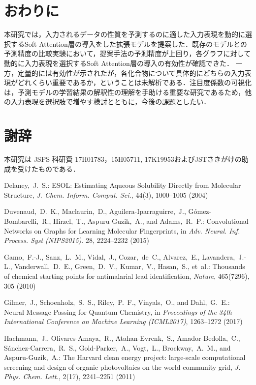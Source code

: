 \documentclass[twocolumn]{jarticle}
\begin{document}
\vspace{-10pt}
\section{おわりに}
本研究では，入力されるデータの性質を予測するのに適した入力表現を動的に選択するSoft Attention層の導入をした拡張モデルを提案した．既存のモデルとの予測精度の比較実験において，提案手法の予測精度が上回り，各グラフに対して動的に入力表現を選択するSoft Attention層の導入の有効性が確認できた．
一方，定量的には有効性が示されたが，各化合物について具体的にどちらの入力表現がどれくらい重要であるか，ということは未解析である．注目度係数の可視化は，予測モデルの学習結果の解釈性の理解を手助ける重要な研究であるため，他の入力表現を選択肢で増やす検討とともに，今後の課題としたい．

\vspace{-10pt}
\section*{謝辞}
本研究は JSPS 科研費 17H01783，15H05711, 17K19953およびJSTさきがけの助成を受けたものである．

\begin{spacing}{0.1}
\footnotesize
\begin{thebibliography}{}

Delaney,~J.~S.: ESOL: Estimating Aqueous Solubility Directly
  from Molecular Structure, {\em J. Chem. Inform. Comput. Sci.}, 44(3), 1000--1005 (2004)

Duvenaud,~D.~K., Maclaurin,~D., Aguilera{-}Iparraguirre,~J.,
  G{\'{o}}mez{-}Bombarelli,~R., Hirzel,~T., Aspuru{-}Guzik,~A., and
  Adams,~R.~P.: Convolutional Networks on Graphs for Learning Molecular
  Fingerprints, in {\em Adv. Neural. Inf. Process. Syst (NIPS2015)}. 28, 2224--2232 (2015)

Gamo,~F.-J., Sanz,~L.~M., Vidal,~J., Cozar,~de~C.,
  Alvarez,~E., Lavandera,~J.-L., Vanderwall,~D.~E., Green,~D.~V., Kumar,~V.,
  Hasan,~S., et~al.: Thousands of chemical starting points for antimalarial
  lead identification, {\em Nature}, 465(7296), 305 (2010)

Gilmer,~J., Schoenholz,~S.~S., Riley,~P.~F., Vinyals,~O., and
  Dahl,~G.~E.: Neural Message Passing for Quantum Chemistry, in {\em
  Proceedings of the 34th International Conference on Machine Learning ({ICML}2017)}, 1263--1272 (2017)

Hachmann,~J., Olivares-Amaya,~R., Atahan-Evrenk,~S.,
  Amador-Bedolla,~C., S{\'a}nchez-Carrera,~R.~S., Gold-Parker,~A., Vogt,~L.,
  Brockway,~A.~M., and Aspuru-Guzik,~A.: The Harvard clean energy project:
  large-scale computational screening and design of organic photovoltaics on
  the world community grid, {\em J. Phys. Chem. Lett.},
  2(17), 2241--2251 (2011)

\end{thebibliography}

\end{spacing} 
\end{document}
